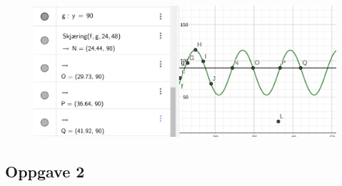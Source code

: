 { \begin{figure}
 	\centering
 	\includegraphics[scale=0.2]{opg1c}
 \end{figure}
}
\subsection*{Oppgave 2}
